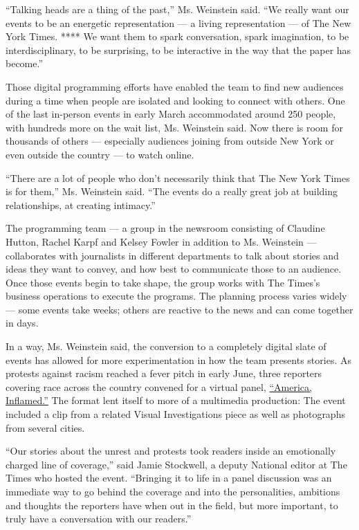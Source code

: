 ``Talking heads are a thing of the past,'' Ms. Weinstein said. ``We
really want our events to be an energetic representation --- a living
representation --- of The New York Times. **** We want them to spark
conversation, spark imagination, to be interdisciplinary, to be
surprising, to be interactive in the way that the paper has become.''

Those digital programming efforts have enabled the team to find new
audiences during a time when people are isolated and looking to connect
with others. One of the last in-person events in early March
accommodated around 250 people, with hundreds more on the wait list, Ms.
Weinstein said. Now there is room for thousands of others --- especially
audiences joining from outside New York or even outside the country ---
to watch online.

``There are a lot of people who don't necessarily think that The New
York Times is for them,'' Ms. Weinstein said. ``The events do a really
great job at building relationships, at creating intimacy.''

The programming team --- a group in the newsroom consisting of Claudine
Hutton, Rachel Karpf and Kelsey Fowler in addition to Ms. Weinstein ---
collaborates with journalists in different departments to talk about
stories and ideas they want to convey, and how best to communicate those
to an audience. Once those events begin to take shape, the group works
with The Times's business operations to execute the programs. The
planning process varies widely --- some events take weeks; others are
reactive to the news and can come together in days.

In a way, Ms. Weinstein said, the conversion to a completely digital
slate of events has allowed for more experimentation in how the team
presents stories. As protests against racism reached a fever pitch in
early June, three reporters covering race across the country convened
for a virtual panel,
\href{https://timesevents.nytimes3xbfgragh.onion/race}{``America,
Inflamed.''} The format lent itself to more of a multimedia production:
The event included a clip from a related Visual Investigations piece as
well as photographs from several cities.

``Our stories about the unrest and protests took readers inside an
emotionally charged line of coverage,'' said Jamie Stockwell, a deputy
National editor at The Times who hosted the event. ``Bringing it to life
in a panel discussion was an immediate way to go behind the coverage and
into the personalities, ambitions and thoughts the reporters have when
out in the field, but more important, to truly have a conversation with
our readers.''

